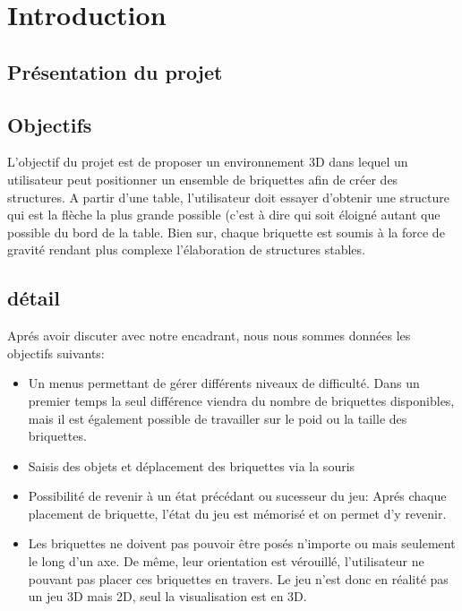 \documentclass[frenchb,twoside]{EPURapport}
\begin{document}
\chapter{Introduction}

\section{Présentation du projet}
\section{Objectifs}
    L'objectif du projet est de proposer un environnement 3D dans lequel un
    utilisateur peut positionner un ensemble de briquettes afin de créer des
    structures. A partir d'une table, l'utilisateur doit essayer d'obtenir une
    structure qui est la flèche la plus grande possible (c'est à dire qui soit
    éloigné autant que possible du bord de la table.
    Bien sur, chaque briquette est soumis à la force de gravité rendant plus
    complexe l'élaboration de structures stables.



\section{détail}
    Aprés avoir discuter avec notre encadrant, nous nous sommes données les objectifs suivants:
    \begin{itemize}
        \item Un menus permettant de gérer différents niveaux de difficulté.
        Dans un premier temps la seul différence viendra du nombre de
        briquettes disponibles, mais il est également possible de travailler
        sur le poid ou la taille des briquettes.
        \item Saisis des objets et déplacement des briquettes via la souris
        \item Possibilité de revenir à un état précédant ou sucesseur du jeu:
        Aprés chaque placement de briquette, l'état du jeu est mémorisé et on
        permet d'y revenir.
        \item Les briquettes ne doivent pas pouvoir être posés n'importe ou
        mais seulement le long d'un axe. De même, leur orientation est
        vérouillé, l'utilisateur ne pouvant pas placer ces briquettes en
        travers.
        Le jeu n'est donc en réalité pas un jeu 3D mais 2D, seul la visualisation est en 3D.

    \end{itemize}
    
\end{document}
